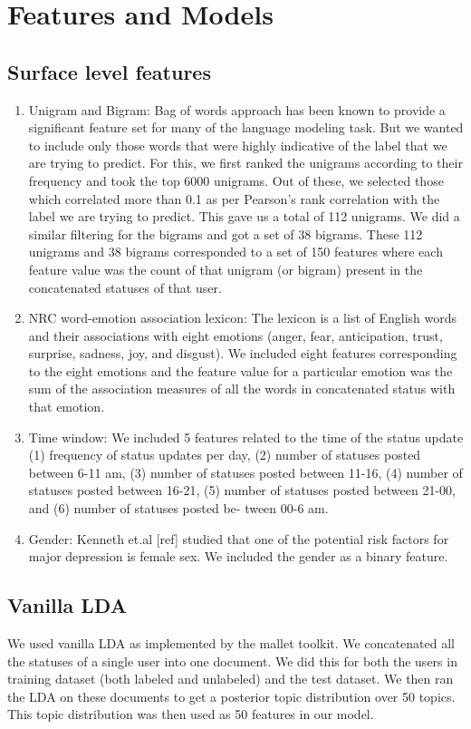 \section{Features and Models }
\label{sec:baseline}

\subsection{Surface level features}
\begin{enumerate}
  \item Unigram and Bigram: Bag of words approach has been known to provide a significant feature set for many of the language modeling task. But we wanted to include only those words that were highly indicative of the label that we are trying to predict. For this, we first ranked the unigrams according to their frequency and took the top 6000 unigrams. Out of these, we selected those which correlated more than 0.1 as per Pearson's rank correlation with the label we are trying to predict. This gave us a total of 112 unigrams. We did a similar filtering for the bigrams and got a set of 38 bigrams. These 112 unigrams and 38 bigrams corresponded to a set of 150 features where each feature value was the count of that unigram (or bigram) present in the concatenated statuses of that user.
  \item NRC word-emotion association lexicon: The lexicon is a list of English words and their associations with eight emotions (anger, fear, anticipation, trust, surprise, sadness, joy, and disgust). We included eight features corresponding to the eight emotions and the feature value for a particular emotion was the sum of the association measures of all the words in concatenated status with that emotion.
  \item Time window:  We included 5 features related to the time of the status update (1) frequency of status updates per day, (2) number of statuses posted between 6-11 am, (3) number of statuses posted between 11-16, (4) number of statuses posted between 16-21, (5) number of statuses posted between 21-00, and (6) number of statuses posted be- tween 00-6 am.
 \item Gender: Kenneth et.al [ref] studied that one of the potential risk factors for major depression is female sex. We included the gender as a binary feature.
\end{enumerate}
\subsection {Vanilla LDA}
We used vanilla LDA as implemented by the mallet toolkit. We concatenated all the statuses of a single user into one document. We did this for both the users in training dataset (both labeled and unlabeled) and the test dataset. We then ran the LDA on these documents to get a posterior topic distribution over 50 topics. This topic distribution was then used as 50 features in our model.
